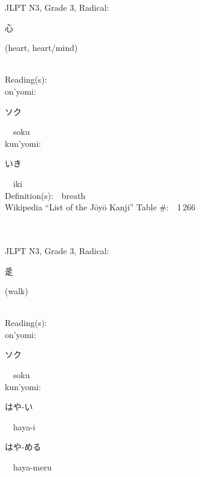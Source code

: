 \begin{multicols}{2}
{JLPT N3, Grade 3, Radical:\ \ {\begin{CJK}{UTF8}{min} 心 \end{CJK}} (heart, heart/mind) } \\
Reading(s):\ \ \\
{\hspace*{1em}}on'yomi:\ \ \\
{\hspace*{2em}}{\begin{CJK}{UTF8}{min} ソク \end{CJK}}\ \ soku\ \ \\
{\hspace*{1em}}kun'yomi:\ \ \\
{\hspace*{2em}}{\begin{CJK}{UTF8}{min} いき \end{CJK}}\ \ iki\ \ \\
Definition(s):\ \ breath \\
Wikipedia ``List of the J\=oy\=o Kanji'' Table \#:\ \ 1\,266 \\
\ \ \\
{\fontsize{34pt}{40pt}  }\ \ \\  %
{JLPT N3, Grade 3, Radical:\ \ {\begin{CJK}{UTF8}{min} 辵 \end{CJK}} (walk) } \\
Reading(s):\ \ \\
{\hspace*{1em}}on'yomi:\ \ \\
{\hspace*{2em}}{\begin{CJK}{UTF8}{min} ソク \end{CJK}}\ \ soku\ \ \\
{\hspace*{1em}}kun'yomi:\ \ \\
{\hspace*{2em}}{\begin{CJK}{UTF8}{min} はや-い \end{CJK}}\ \ haya-i\ \ \\
{\hspace*{2em}}{\begin{CJK}{UTF8}{min} はや-める \end{CJK}}\ \ haya-meru\ \ \\

\end{multicols}
